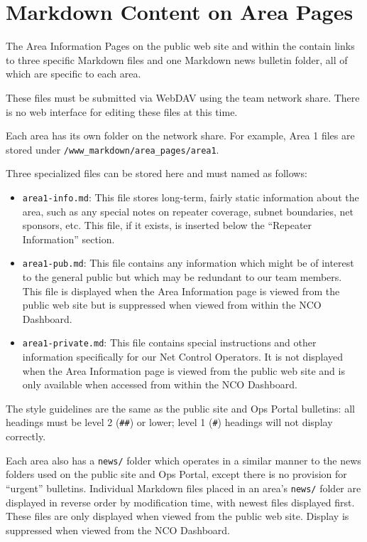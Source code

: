 \documentclass[pdflatex,letterpaper,twoside,12pt]{book}
\begin{document}

\section{Markdown Content on Area Pages}

The Area Information Pages on the public web site and within the  contain links to three specific Markdown files and one Markdown news bulletin folder, all of which are specific to each area.

These files must be submitted via WebDAV using the team network share.  There is no web interface for editing these files at this time.

Each area has its own folder on the network share.  For example, Area 1 files are stored under \texttt{/www\_markdown/area\_pages/area1}.

Three specialized files can be stored here and must named as follows:

\begin{itemize}
\item \texttt{area1-info.md}: This file stores long-term, fairly static information about the area, such as any special notes on repeater coverage, subnet boundaries, net sponsors, etc.  This file, if it exists, is inserted below the ``Repeater Information'' section.
\item \texttt{area1-pub.md}: This file contains any information which might be of interest to the general public but which may be redundant to our team members.  This file is displayed when the Area Information page is viewed from the public web site but is suppressed when viewed from within the NCO Dashboard.
\item \texttt{area1-private.md}:  This file contains special instructions and other information specifically for our Net Control Operators.  It is not displayed when the Area Information page is viewed from the public web site and is only available when accessed from within the NCO Dashboard.
\end{itemize}

The style guidelines are the same as the public site and Ops Portal bulletins:  all headings must be level 2 (\texttt{\#\#}) or lower;  level 1 (\texttt{\#}) headings will not display correctly.

Each area also has a \texttt{news/} folder which operates in a similar manner to the news folders used on the public site and Ops Portal, except there is no provision for ``urgent'' bulletins.  Individual Markdown files placed in an area's \texttt{news/} folder are displayed in reverse order by modification time, with newest files displayed first.  These files are only displayed when viewed from the public web site.  Display is suppressed when viewed from the NCO Dashboard.
\end{document}
